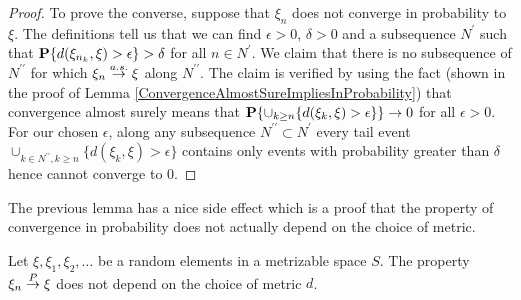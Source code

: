 \begin{proof}
To prove the converse, suppose that $\xi_n$ does not converge in
probability to $\xi$.  The definitions tell us that we can find
$\epsilon > 0$, $\delta > 0$ and a subsequence $N^\prime$ such that
$\textbf{P}\{d(\xi_{n_k}, \xi) > \epsilon\} > \delta$ for all $n \in
N^\prime$.  We claim that there is no subsequence of $N^{\prime
  \prime}$ for which $\xi_n \overset{a.s.}\to \xi$ along $N^{\prime \prime}$.  The
claim is verified by using the fact (shown in the proof of Lemma
\ref{ConvergenceAlmostSureImpliesInProbability}) that convergence
almost surely means that $\textbf{P}\{\cup_{k\geq n} \lbrace d(\xi_k,
  \xi) > \epsilon \rbrace\} \to 0$ for all $\epsilon > 0$.  For our
chosen $\epsilon$, along any
subsequence $N^{\prime \prime} \subset N^{\prime}$ every tail event
$\cup_{k \in N^{\prime \prime}, k\geq n} \lbrace d(\xi_k,
  \xi) > \epsilon \rbrace$ contains only events with probability greater
  than $\delta$ hence cannot converge to $0$.
\end{proof}

The previous lemma has a nice side effect which is a proof that the
property of convergence in probability does not actually depend on the
choice of metric.
\begin{cor}\label{ConvergenceInProbabilityIndependentOfMetric}Let $\xi, \xi_1, \xi_2, \dots$ be a random elements in a
  metrizable space $S$.  The property $\xi_n \overset{P}\to \xi$ does not
  depend on the choice of metric $d$.
\end{cor}

